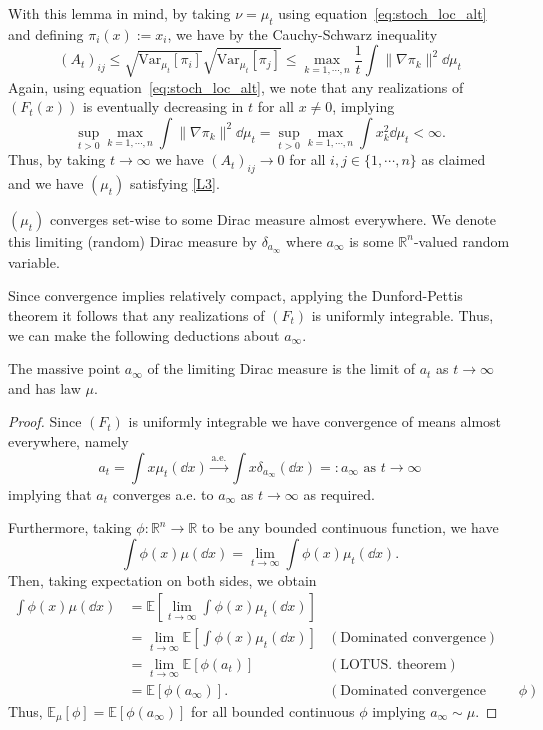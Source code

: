 With this lemma in mind, by taking \(\nu = \mu_t\) using equation~\eqref{eq:stoch_loc_alt} and defining
\(\pi_i(x) := x_i\), we have by the Cauchy-Schwarz inequality
\[(A_t)_{ij} \le \sqrt{\text{Var}_{\mu_t}[\pi_i]}\sqrt{\text{Var}_{\mu_t}[\pi_j]} 
  \le \max_{k = 1, \cdots, n} \frac{1}{t}\int \|\nabla \pi_k\|^2 \dd \mu_t\]
Again, using equation~\eqref{eq:stoch_loc_alt}, we note that any realizations of \((F_t(x))\) is eventually 
decreasing in \(t\) for all \(x \neq 0\), implying 
\[\sup_{t > 0} \max_{k = 1, \cdots, n} \int \|\nabla \pi_k\|^2 \dd \mu_t = 
\sup_{t > 0} \max_{k = 1, \cdots, n} \int x_k^2 \dd \mu_t < \infty.\] 
Thus, by taking \(t \to \infty\) we have \((A_t)_{ij} \to 0\) for all \(i, j \in \{1, \cdots, n\}\) as claimed 
and we have \((\mu_t)\) satisfying \ref{L3}.

\begin{corollary}
  \((\mu_t)\) converges set-wise to some Dirac measure almost everywhere. We denote this 
  limiting (random) Dirac measure by \(\delta_{a_\infty}\) where \(a_\infty\) is some 
  \(\mathbb{R}^n\)-valued random variable.
\end{corollary}

Since convergence implies relatively compact, applying the Dunford-Pettis theorem it follows that 
any realizations of \((F_t)\) is uniformly integrable. Thus, we can make the following deductions 
about \(a_\infty\).

\begin{corollary}\label{cor:lim_dis}
  The massive point \(a_\infty\) of the limiting Dirac measure is the limit of \(a_t\) as 
  \(t \to \infty\) and has law \(\mu\).
\end{corollary}
\begin{proof}
  Since \((F_t)\) is uniformly integrable we have convergence of means almost everywhere, namely
  \[a_t = \int x \mu_t(\dd x) \xrightarrow{\text{a.e.}} \int x \delta_{a_\infty}(\dd x) =: a_\infty \text{ as } t \to \infty\]
  implying that \(a_t\) converges a.e. to \(a_\infty\) as \(t \to \infty\) as required. 
  
  Furthermore, taking \(\phi : \mathbb{R}^n \to \mathbb{R}\) to be any bounded continuous function, we have
  \[\int \phi(x) \mu(\dd x) = \lim_{t \to \infty} \int \phi(x) \mu_t(\dd x).\]
  Then, taking expectation on both sides, we obtain
  \begin{align*}
    \int \phi(x) \mu(\dd x) & = \mathbb{E}\left[\lim_{t \to \infty} \int \phi(x) \mu_t(\dd x)\right] & \\
    & = \lim_{t \to \infty} \mathbb{E}\left[\int \phi(x) \mu_t(\dd x)\right] & (\text{Dominated convergence})\\
    & = \lim_{t \to \infty} \mathbb{E}[\phi(a_t)] & (\text{LOTUS. theorem})\\
    & = \mathbb{E}[\phi(a_\infty)]. & (\text{Dominated convergence \& continuity of } \phi)
  \end{align*}
  Thus, \(\mathbb{E}_\mu[\phi] = \mathbb{E}[\phi(a_\infty)]\) for all bounded continuous \(\phi\) implying 
  \(a_\infty \sim \mu\).
\end{proof}

